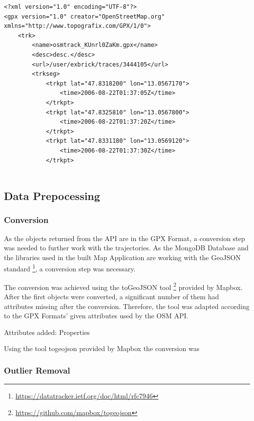 \begin{lstlisting}
<?xml version="1.0" encoding="UTF-8"?>
<gpx version="1.0" creator="OpenStreetMap.org" xmlns="http://www.topografix.com/GPX/1/0">
    <trk>
        <name>osmtrack_KUnrl0ZaKm.gpx</name>
        <desc>desc.</desc>
        <url>/user/exbrick/traces/3444105</url>
        <trkseg>
            <trkpt lat="47.8318200" lon="13.0567170">
                <time>2006-08-22T01:37:05Z</time>
            </trkpt>
            <trkpt lat="47.8325810" lon="13.0567800">
                <time>2006-08-22T01:37:20Z</time>
            </trkpt>
            <trkpt lat="47.8331180" lon="13.0569120">
                <time>2006-08-22T01:37:30Z</time>
            </trkpt>
            
\end{lstlisting}

\subsection{Data Prepocessing}

\subsubsection{Conversion}

As the objects returned from the API are in the GPX Format, a conversion step was needed to further work with the trajectories. As the MongoDB Database and the libraries used in the built Map Application are working with the GeoJSON standard \footnote{\url{https://datatracker.ietf.org/doc/html/rfc7946}}, a conversion step was necessary.

The conversion was achieved using the toGeoJSON tool \footnote{\url{https://github.com/mapbox/togeojson}} provided by Mapbox. After the first objects were converted, a significant number of them had attributes missing after the conversion. Therefore, the tool was adapted according to the GPX Formats' given attributes used by the OSM API.  

Attributes added: Properties

Using the tool togeojson provided by Mapbox the conversion was 


\subsubsection{Outlier Removal}



